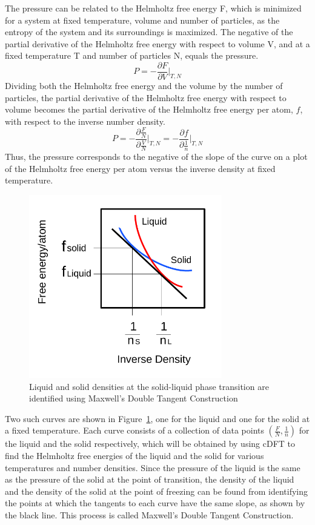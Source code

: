 \documentclass[double,12pt]{beavtex}
\begin{document}
The pressure can be related to the Helmholtz free energy F, which is minimized 
for a system at fixed temperature, volume and number of particles, as the 
entropy of the system and its surroundings is maximized. The negative of 
the partial derivative of the Helmholtz free energy with respect to volume V, 
and at a fixed temperature T and number of particles N, equals the pressure. 
\begin{equation}{P=-\frac{\partial{F}}{\partial{V}}\bigg|_{T,N}}\end{equation}
\noindent Dividing both the Helmholtz free energy and the volume by the 
number of particles, the partial derivative of the Helmholtz free energy 
with respect to volume becomes the partial derivative of the Helmholtz 
free energy per atom, $f$,  with respect to the inverse number density. 
\begin{equation}{P=-\frac{\partial{\frac{F}{N}}}{\partial{\frac{V}{N}}}\bigg|_{T,N} = -\frac{\partial{f}}{\partial{\frac{1}{n}}}\bigg|_{T,N}}\end{equation} 
Thus, the pressure corresponds to the negative of the slope of the curve 
on a plot of the Helmholtz free energy per atom versus the inverse 
density at fixed temperature. 
 
 \begin{figure}
    \centering
     \includegraphics[height=8cm]{figs/MaxwellDTC-Fig1.pdf}
    \caption{Liquid and solid densities at the solid-liquid phase 
    transition are identified using Maxwell's Double Tangent Construction}
    \label{fig:MaxwellDT}
  \end{figure}

Two such curves are shown in Figure~\ref{fig:MaxwellDT}, one for the liquid 
and one for the solid at a fixed temperature. Each curve consists of a 
collection of data points $(\frac{F}{N}, \frac{1}{n})$ for the liquid and
the solid respectively, which will be obtained by using cDFT to find the 
Helmholtz free energies of the liquid and the solid for various 
temperatures and number densities. 
Since the pressure of the 
liquid is the same as the pressure of the solid at the point of transition, 
the density of the liquid and the density of the solid at the point of 
freezing can be found from identifying the points at which the 
tangents to each curve have the same slope, as shown by the black line. 
This process is called Maxwell's Double Tangent Construction. 
\end{document}
